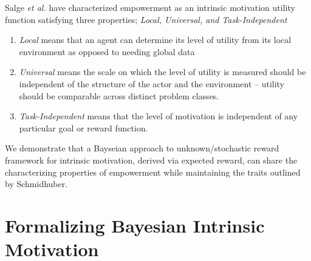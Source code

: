 \documentclass{article}
\begin{document}
Salge \textit{et al.} \cite{salge2014empowerment} have characterized empowerment as an intrinsic motivation utility function satisfying three properties; \textit{Local, Universal, and Task-Independent}
\begin{enumerate}
\item \textit{Local} means that an agent can determine its level of utility from its local environment as opposed to needing global data\
\item \textit{Universal} means the scale on which the level of utility is measured should be independent of the structure of the actor and the environment -- utility should be comparable across distinct problem classes.
\item \textit{Task-Independent} means that the level of motivation is independent of any particular goal or reward function.
\end{enumerate}

We demonstrate that a Bayseian approach to unknown/stochastic reward framework for intrinsic motivation, derived via expected reward, can share the characterizing properties of empowerment while maintaining the traits outlined by Schmidhuber.  





\section{Formalizing Bayesian Intrinsic Motivation}
\end{document}
